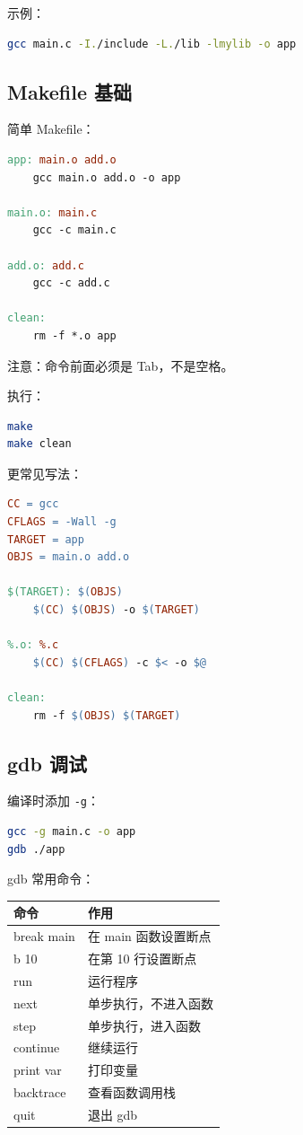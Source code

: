 \documentclass[UTF8,a4paper,12pt]{ctexart}
\begin{document}
示例：

\begin{lstlisting}[language=bash]
gcc main.c -I./include -L./lib -lmylib -o app
\end{lstlisting}

\subsection{Makefile 基础}

简单 Makefile：

\begin{lstlisting}[language=make]
app: main.o add.o
	gcc main.o add.o -o app

main.o: main.c
	gcc -c main.c

add.o: add.c
	gcc -c add.c

clean:
	rm -f *.o app
\end{lstlisting}

注意：命令前面必须是 Tab，不是空格。

执行：

\begin{lstlisting}[language=bash]
make
make clean
\end{lstlisting}

更常见写法：

\begin{lstlisting}[language=make]
CC = gcc
CFLAGS = -Wall -g
TARGET = app
OBJS = main.o add.o

$(TARGET): $(OBJS)
	$(CC) $(OBJS) -o $(TARGET)

%.o: %.c
	$(CC) $(CFLAGS) -c $< -o $@

clean:
	rm -f $(OBJS) $(TARGET)
\end{lstlisting}

\subsection{gdb 调试}

编译时添加 \texttt{-g}：

\begin{lstlisting}[language=bash]
gcc -g main.c -o app
gdb ./app
\end{lstlisting}

gdb 常用命令：

\begin{longtable}{p{4cm}p{10cm}}
\toprule
命令 & 作用 \\
\midrule
break main & 在 main 函数设置断点 \\
b 10 & 在第 10 行设置断点 \\
run & 运行程序 \\
next & 单步执行，不进入函数 \\
step & 单步执行，进入函数 \\
continue & 继续运行 \\
print var & 打印变量 \\
backtrace & 查看函数调用栈 \\
quit & 退出 gdb \\
\bottomrule
\end{longtable}
\end{document}
